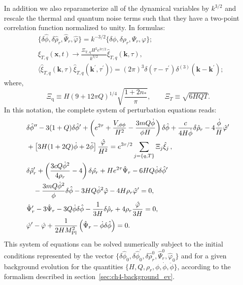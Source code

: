 In addition we also reparameterize all of the dynamical variables by $k^{3/2}$ and rescale the thermal 
 and quantum noise terms such that they have a two-point correlation function normalized to unity. In formulas: 
\begin{align}
&\{\delta\hat{\phi},\delta\hat{\rho}_r,\hat{\Psi}_r,\hat{\varphi}\}=k^{-3/2}\{\delta\phi,\delta\rho_r,\Psi_r,\varphi\}; \label{eq:ch4-3.14}\\
&\xi_{T,q}(\mathbf{x},t)\rightarrow \frac{\Xi_{\mathrm{T,q}}H^2e^{3\tau/2}}{k^{3/2}}\hat{\xi}_{T,q}(\mathbf{k},\tau),  \\
&\langle\hat{\xi}_{T,q}(\mathbf{k},\tau) \hat{\xi}_{T,q}(\mathbf{k}^\prime,\tau^\prime)\rangle=(2\pi)^3\delta\left(\tau-\tau^{\prime}\right) \delta^{(3)}(\mathbf{k}-\mathbf{k}^{\prime});
\end{align}
where,
\begin{equation}
    \Xi_{\mathrm{q}}\equiv H(9+12\pi Q)^{1/4}\sqrt{\frac{1+2n_*}{\pi}}, \qquad \Xi_T\equiv \sqrt{6H QT}. 
    \label{eq:ch4-noise_amps}
\end{equation}
In this notation, the complete system of perturbation equations reads:
\begin{align}
    &\delta \hat{\phi}^{\prime\prime}-3 (1+Q) \delta \hat{\phi}^\prime+\left(e^{2\tau}+\frac{V_{, \phi \phi}}{H^2}-\frac{3mQ \dot{\phi}}{\phi H}\right) \delta \hat{\phi} +\frac{ c}{4 H \dot{\phi}} \delta \hat{\rho}_r -4\frac{\dot{\phi}}{H}\hat{\varphi}^{\prime}  \nonumber \\
    &+\left[3H(1+2Q)\dot{\phi}+2\Ddot{\phi}\right]\frac{\hat{\varphi}}{H^2}=e^{3\tau/2}\sum_{j=\{q,T\}} \Xi_j \hat{\xi}_j\,, \label{eq:ch4-Gab2.1} \\
    &\delta \hat{\rho}^\prime_r+\left(\frac{3c Q \dot{\phi}^2}{4 \rho_r}-4\right) \delta \hat{\rho_r}+He^{2\tau}\hat{\Psi}_r-6 H Q \dot{\phi} \delta \hat{\phi}^\prime \nonumber \\
    &\quad -\frac{3m Q \dot{\phi}^2}{\phi} \delta \hat{\phi}-3HQ\dot{\phi}^2\hat{\varphi}-4H\rho_r\hat{\varphi}^\prime=0, \label{eq:ch4-Gab2.2}\\
    &\hat{\Psi}^\prime_r-3 \hat{\Psi}_r-3Q \dot{\phi} \delta \hat{\phi}-\frac{1}{3H} \delta \hat{\rho}_r+4 \rho_r \frac{\hat{\varphi}}{3H}=0, \label{eq:ch4-Gab2.3} \\
      &\hat{\varphi}^\prime - \hat{\varphi}+ \frac{1}{2H M_{\mathrm{Pl}}^2}\left(\hat{\Psi}_r- \dot{\phi} \delta \hat{\phi}\right)=0. \label{eq:ch4-Gab2.4}
\end{align}
This system of equations can be solved numerically subject to the initial conditions represented by the vector $\{\delta \hat{\phi}_0,\delta\hat{\phi}^\prime_0,\delta \hat{\rho}^0_r, \hat{\Psi}^0_r,\hat{\varphi}_0\}$
and for a given background evolution for the quantities $\{H,Q,\rho_r,\phi,\dot{\phi},\ddot{\phi}\}$, according to the formalism described in section~\ref{sec:ch4-background_ev}.

